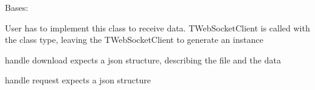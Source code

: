 \documentclass[letterpaper,10pt,english]{sphinxmanual}
\begin{document}
\begin{savenotes}\begin{fulllineitems}
\label{\detokenize{eezz:eezz.websocket.TWebSocketAgent}}
\pysigstartsignatures
{}
\pysigstopsignatures
\sphinxAtStartPar
Bases: 

\sphinxAtStartPar
User has to implement this class to receive data.
TWebSocketClient is called with the class type, leaving the TWebSocketClient to generate an instance

\begin{savenotes}\begin{fulllineitems}
\label{\detokenize{eezz:eezz.websocket.TWebSocketAgent.handle_download}}
\pysigstartsignatures
{}
\pysigstopsignatures
\sphinxAtStartPar
handle download expects a json structure, describing the file and the data

\end{fulllineitems}\end{savenotes}


\begin{savenotes}\begin{fulllineitems}
\label{\detokenize{eezz:eezz.websocket.TWebSocketAgent.handle_request}}
\pysigstartsignatures
{}
\pysigstopsignatures
\sphinxAtStartPar
handle request expects a json structure

\end{fulllineitems}\end{savenotes}


\end{fulllineitems}
\end{savenotes}
\end{document}

